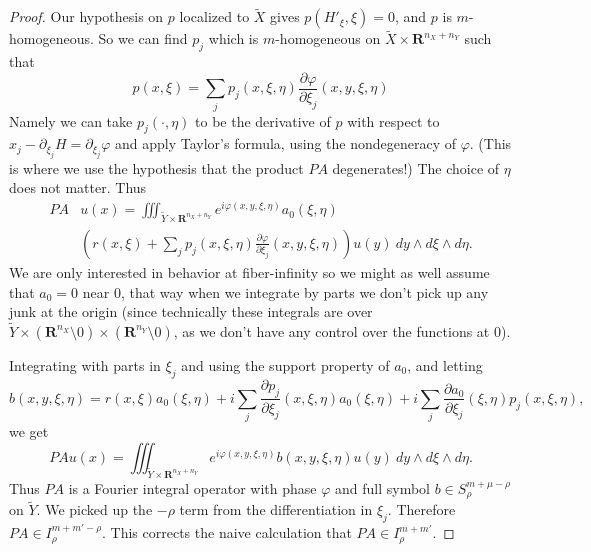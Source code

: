 \documentclass[reqno,12pt,letterpaper]{amsart}
\newcommand{\RR}{\mathbf{R}}
\theoremstyle{definition}
\begin{document}
\begin{proof}
Our hypothesis on $p$ localized to $\tilde X$ gives $p(H'_\xi, \xi) = 0$, and $p$ is $m$-homogeneous.
So we can find $p_j$ which is $m$-homogeneous on $\tilde X \times \RR^{n_X + n_Y}$ such that
$$p(x, \xi) = \sum_j p_j(x, \xi, \eta) \frac{\partial \varphi}{\partial \xi_j}(x, y, \xi, \eta)$$
Namely we can take $p_j(\cdot, \eta)$ to be the derivative of $p$ with respect to $x_j - \partial_{\xi_j}H = \partial_{\xi_j} \varphi$ and apply Taylor's formula, using the nondegeneracy of $\varphi$.
(This is where we use the hypothesis that the product $PA$ degenerates!)
The choice of $\eta$ does not matter.
Thus
\begin{align*}
PA&u(x) =  \iiint_{\tilde Y \times \RR^{n_X + n_Y}} e^{i\varphi(x, y, \xi, \eta)}a_0(\xi, \eta)\\
&\left(r(x, \xi) + \sum_j p_j(x, \xi, \eta) \frac{\partial \varphi}{\partial \xi_j}(x, y, \xi, \eta)\right) u(y) ~dy \wedge d\xi \wedge d\eta.
\end{align*}
We are only interested in behavior at fiber-infinity so we might as well assume that $a_0 = 0$ near $0$, that way when we integrate by parts we don't pick up any junk at the origin (since technically these integrals are over $\tilde Y \times (\RR^{n_X} \setminus 0) \times (\RR^{n_Y} \setminus 0)$, as we don't have any control over the functions at $0$).

Integrating with parts in $\xi_j$ and using the support property of $a_0$, and letting
$$b(x, y, \xi, \eta) = r(x, \xi)a_0(\xi, \eta) + i\sum_j \frac{\partial p_j}{\partial \xi_j}(x, \xi, \eta) a_0(\xi, \eta) + i\sum_j \frac{\partial a_0}{\partial \xi_j}(\xi, \eta) p_j(x, \xi, \eta),$$
we get
$$PAu(x) = \iiint_{\tilde Y \times \RR^{n_X + n_Y}} e^{i\varphi(x, y, \xi, \eta)} b(x, y, \xi, \eta) u(y) ~dy \wedge d\xi \wedge d\eta.$$
Thus $PA$ is a Fourier integral operator with phase $\varphi$ and full symbol $b \in S^{m + \mu - \rho}_\rho$ on $\tilde Y$.
We picked up the $-\rho$ term from the differentiation in $\xi_j$.
Therefore $PA \in I^{m + m' - \rho}_\rho$.
This corrects the naive calculation that $PA \in I^{m + m'}_\rho$.


\end{proof}
\end{document}

